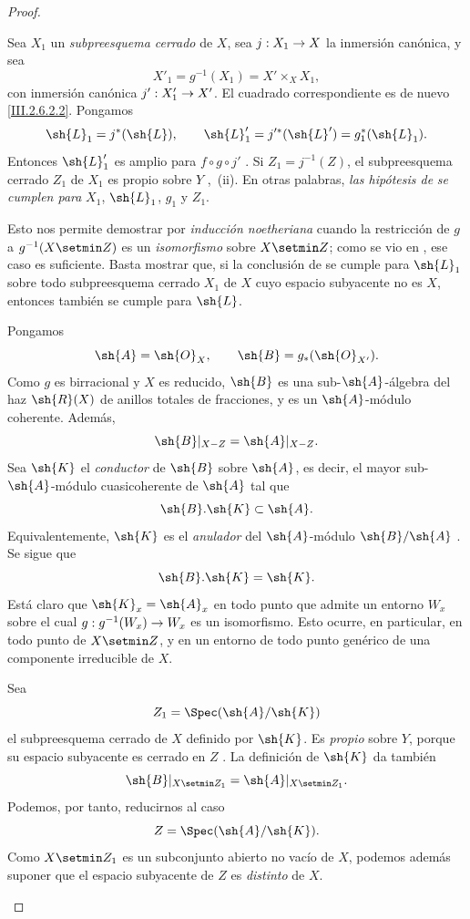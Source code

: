 \documentclass[oneside]{amsart}
\makeatletter
\newcommand{\ega@arrow}[2]{\mathchoice{#1}{#2}{#2}{#2}}
\renewcommand{\to}{\ega@arrow{\longrightarrow}{\rightarrow}}
\newcommand{\oldpage}[2][]{{\marginnote{\normalfont\textbf{#1}~|~#2}}\ignorespaces}
\let\EGAOriginalLabel\label
\renewcommand{\label}[1]{\phantomsection\EGAOriginalLabel{#1}}
\makeatother
\begin{document}
\begin{proof}
\begin{env}[2.6.2.3]
\label{III.2.6.2.3}
Sea $X_1$ un \emph{subpreesquema cerrado} de $X$, sea $j:X_1\to X$ la
inmersión canónica, y sea
\[
  X'_1=g^{-1}(X_1)=X'\times_X X_1,
\]
con inmersión canónica $j':X'_1\to X'$.
El cuadrado correspondiente es de nuevo \eqref{III.2.6.2.2}.
Pongamos
\[
  \sh{L}_1=j^*(\sh{L}),
  \qquad
  \sh{L}'_1=j'^*(\sh{L}')=g_1^*(\sh{L}_1).
\]
Entonces $\sh{L}'_1$ es amplio para $f\circ g\circ j'$
.
Si $Z_1=j^{-1}(Z)$, el subpreesquema cerrado $Z_1$ de $X_1$ es propio
sobre $Y$ ,~(ii).
En otras palabras, \emph{las hipótesis de}  \emph{se cumplen para}
$X_1$, $\sh{L}_1$, $g_1$ y $Z_1$.
\end{env}

\oldpage[III]{113}

Esto nos permite demostrar  por \emph{inducción noetheriana}
 cuando la restricción de $g$ a $g^{-1}(X\setmin Z)$ es un
\emph{isomorfismo} sobre $X\setmin Z$; como se vio en , ese caso es
suficiente.
Basta mostrar que, si la conclusión de  se cumple
para $\sh{L}_1$ sobre todo subpreesquema cerrado $X_1$ de $X$ cuyo
espacio subyacente no es $X$, entonces también se cumple para $\sh{L}$.

\begin{env}[2.6.2.4]
\label{III.2.6.2.4}
Pongamos
\[
  \sh{A}=\sh{O}_X,
  \qquad
  \sh{B}=g_*(\sh{O}_{X'}).
\]
Como $g$ es birracional y $X$ es reducido, $\sh{B}$ es una
sub-$\sh{A}$-álgebra del haz $\sh{R}(X)$ de anillos totales de fracciones,
y es un $\sh{A}$-módulo coherente.
Además,
\[
  \sh{B}|_{X-Z}=\sh{A}|_{X-Z}.
\]
Sea $\sh{K}$ el \emph{conductor} de $\sh{B}$ sobre $\sh{A}$, es decir, el mayor
sub-$\sh{A}$-módulo cuasicoherente de $\sh{A}$ tal que
\[
  \sh{B}.\sh{K}\subset\sh{A}.
\]
Equivalentemente, $\sh{K}$ es el \emph{anulador} del
$\sh{A}$-módulo $\sh{B}/\sh{A}$ .
Se sigue que
\[
  \sh{B}.\sh{K}=\sh{K}.
\]
Está claro que $\sh{K}_x=\sh{A}_x$ en todo punto que admite un entorno
$W_x$ sobre el cual $g:g^{-1}(W_x)\to W_x$ es un isomorfismo.
Esto ocurre, en particular, en todo punto de $X\setmin Z$, y en un
entorno de todo punto genérico de una componente irreducible de
$X$.

Sea
\[
  Z_1=\Spec(\sh{A}/\sh{K})
\]
el subpreesquema cerrado de $X$ definido por $\sh{K}$.
Es \emph{propio} sobre $Y$, porque su espacio subyacente es cerrado en $Z$
.
La definición de $\sh{K}$ da también
\[
  \sh{B}|_{X\setmin Z_1}=\sh{A}|_{X\setmin Z_1}.
\]
Podemos, por tanto, reducirnos al caso
\[
  Z=\Spec(\sh{A}/\sh{K}).
\]
Como $X\setmin Z_1$ es un subconjunto abierto no vacío de $X$, podemos además
suponer que el espacio subyacente de $Z$ es \emph{distinto} de $X$.
\end{env}


\end{proof}
\end{document}
